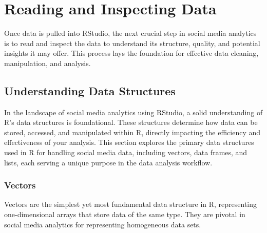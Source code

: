 \documentclass[
]{book}
\begin{document}
\hypertarget{reading-and-inspecting-data}{%
\section{Reading and Inspecting Data}\label{reading-and-inspecting-data}}

Once data is pulled into RStudio, the next crucial step in social media analytics is to read and inspect the data to understand its structure, quality, and potential insights it may offer. This process lays the foundation for effective data cleaning, manipulation, and analysis.

\hypertarget{understanding-data-structures}{%
\subsection{Understanding Data Structures}\label{understanding-data-structures}}

In the landscape of social media analytics using RStudio, a solid understanding of R's data structures is foundational. These structures determine how data can be stored, accessed, and manipulated within R, directly impacting the efficiency and effectiveness of your analysis. This section explores the primary data structures used in R for handling social media data, including vectors, data frames, and lists, each serving a unique purpose in the data analysis workflow.

\hypertarget{vectors-1}{%
\subsubsection{Vectors}\label{vectors-1}}

Vectors are the simplest yet most fundamental data structure in R, representing one-dimensional arrays that store data of the same type. They are pivotal in social media analytics for representing homogeneous data sets.
\end{document}
